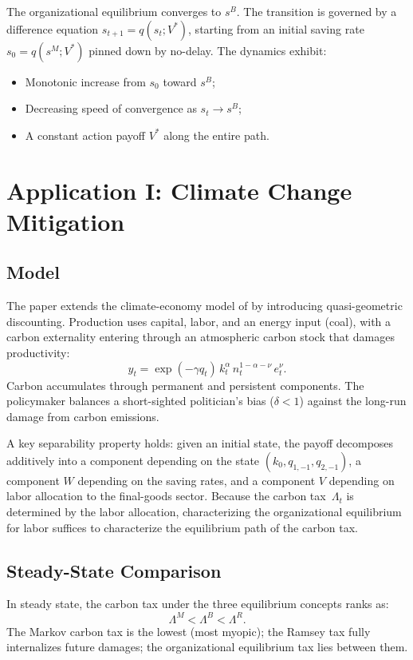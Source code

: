 \documentclass[12pt]{article}
\begin{document}
The organizational equilibrium converges to $s^B$.  The transition is governed by
a difference equation $s_{t+1} = q(s_t; V^*)$, starting from an initial saving
rate $s_0 = q(s^M; V^*)$ pinned down by no-delay.  The dynamics exhibit:
\begin{itemize}
  \item Monotonic increase from $s_0$ toward $s^B$;
  \item Decreasing speed of convergence as $s_t \to s^B$;
  \item A constant action payoff $V^*$ along the entire path.
\end{itemize}


\section{Application I: Climate Change Mitigation}

\subsection{Model}

The paper extends the climate-economy model of \citet{golosov2014optimal} by
introducing quasi-geometric discounting.  Production uses capital, labor, and an
energy input (coal), with a carbon externality entering through an atmospheric
carbon stock that damages productivity:
\[
  y_t = \exp(-\gamma q_t)\, k_t^\alpha\, n_t^{1-\alpha-\nu}\, e_t^\nu.
\]
Carbon accumulates through permanent and persistent components.  The
policymaker balances a short-sighted politician's bias ($\delta < 1$) against
the long-run damage from carbon emissions.

A key separability property holds: given an initial state, the payoff decomposes
additively into a component depending on the state $(k_0, q_{1,-1}, q_{2,-1})$,
a component $W$ depending on the saving rates, and a component $V$ depending on
labor allocation to the final-goods sector.  Because the carbon tax~$\Lambda_t$
is determined by the labor allocation, characterizing the organizational
equilibrium for labor suffices to characterize the equilibrium path of the
carbon tax.

\subsection{Steady-State Comparison}

In steady state, the carbon tax under the three equilibrium concepts ranks as:
\[
  \Lambda^M < \Lambda^B < \Lambda^R.
\]
The Markov carbon tax is the lowest (most myopic); the Ramsey tax fully
internalizes future damages; the organizational equilibrium tax lies between
them.
\end{document}
